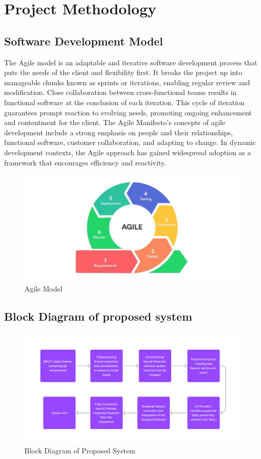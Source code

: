 \chapter{Project Methodology}
 \section{Software Development Model}
 The Agile model is an adaptable and iterative software development process that puts the needs of the client and flexibility first. It breaks the project up into manageable chunks known as sprints or iterations, enabling regular review and modification. Close collaboration between cross-functional teams results in functional software at the conclusion of each iteration. This cycle of iteration guarantees prompt reaction to evolving needs, promoting ongoing enhancement and contentment for the client. The Agile Manifesto's concepts of agile development include a strong emphasis on people and their relationships, functional software, customer collaboration, and adapting to change. In dynamic development contexts, the Agile approach has gained widespread adoption as a framework that encourages efficiency and reactivity.
 \begin{figure}[h]
	\centering
	\includegraphics[scale=0.6]{images/Agile_model.png}
	\caption{Agile Model}
	
	\end{figure}
	
\pagebreak
\section{Block Diagram of proposed system}
	\begin{figure}[h]
		\centering
		\hspace{2cm}
		\includegraphics[scale=0.35]{images/block_diagram.jpg}
		\caption{Block Diagram of Proposed System}
	\end{figure}
	
